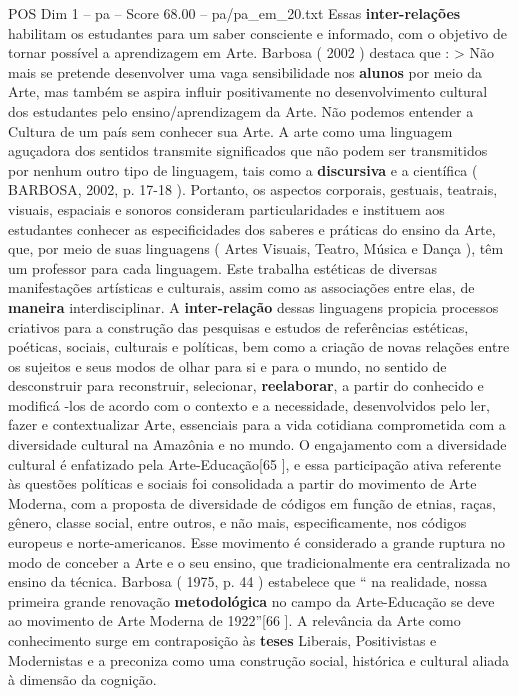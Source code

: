 \begin{textsample}{POS Dim 1 – pa – Score 68.00 – pa/pa\_em\_20.txt}
Essas \textbf{inter-relações} habilitam os estudantes para um saber consciente e informado, com o objetivo de tornar possível a aprendizagem em Arte.
Barbosa ( 2002 ) destaca que : > Não mais se pretende desenvolver uma vaga sensibilidade nos \textbf{alunos} por meio da Arte, mas também se aspira influir positivamente no desenvolvimento cultural dos estudantes pelo ensino/aprendizagem da Arte.
Não podemos entender a Cultura de um país sem conhecer sua Arte.
A arte como uma linguagem aguçadora dos sentidos transmite significados que não podem ser transmitidos por nenhum outro tipo de linguagem, tais como a \textbf{discursiva} e a científica ( BARBOSA, 2002, p. 17-18 ).
Portanto, os aspectos corporais, gestuais, teatrais, visuais, espaciais e sonoros consideram particularidades e instituem aos estudantes conhecer as especificidades dos saberes e práticas do ensino da Arte, que, por meio de suas linguagens ( Artes Visuais, Teatro, Música e Dança ), têm um professor para cada linguagem.
Este trabalha estéticas de diversas manifestações artísticas e culturais, assim como as associações entre elas, de \textbf{maneira} interdisciplinar.
A \textbf{inter-relação} dessas linguagens propicia processos criativos para a construção das pesquisas e estudos de referências estéticas, poéticas, sociais, culturais e políticas, bem como a criação de novas relações entre os sujeitos e seus modos de olhar para si e para o mundo, no sentido de desconstruir para reconstruir, selecionar, \textbf{reelaborar}, a partir do conhecido e modificá -los de acordo com o contexto e a necessidade, desenvolvidos pelo ler, fazer e contextualizar Arte, essenciais para a vida cotidiana comprometida com a diversidade cultural na Amazônia e no mundo.
O engajamento com a diversidade cultural é enfatizado pela Arte-Educação[65 ], e essa participação ativa referente às questões políticas e sociais foi consolidada a partir do movimento de Arte Moderna, com a proposta de diversidade de códigos em função de etnias, raças, gênero, classe social, entre outros, e não mais, especificamente, nos códigos europeus e norte-americanos.
Esse movimento é considerado a grande ruptura no modo de conceber a Arte e o seu ensino, que tradicionalmente era centralizada no ensino da técnica.
Barbosa ( 1975, p. 44 ) estabelece que “ na realidade, nossa primeira grande renovação \textbf{metodológica} no campo da Arte-Educação se deve ao movimento de Arte Moderna de 1922”[66 ].
A relevância da Arte como conhecimento surge em contraposição às \textbf{teses} Liberais, Positivistas e Modernistas e a preconiza como uma construção social, histórica e cultural aliada à dimensão da cognição.

\end{textsample}

